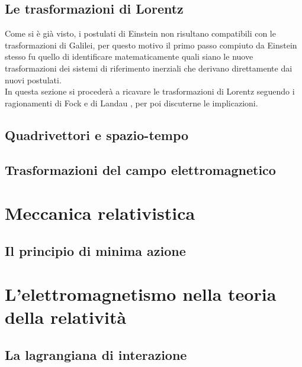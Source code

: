 \documentclass[12pt,a4paper]{book}
\numberwithin{equation}{section}
\begin{document}
\begin{sloppypar}
\section{Le trasformazioni di Lorentz}
Come si è già visto, i postulati di Einstein non risultano compatibili con le trasformazioni di Galilei, 
per questo motivo il primo passo compiuto da Einstein stesso fu quello di identificare matematicamente quali siano 
le nuove trasformazioni dei sistemi di riferimento inerziali che derivano direttamente dai nuovi postulati.\\
In questa sezione si procederà a ricavare le trasformazioni di Lorentz seguendo i ragionamenti di Fock \cite{Fock} e di Landau \cite{Landau}, 
per poi discuterne le implicazioni.  




\section{Quadrivettori e spazio-tempo}
\label{sec:4-vettori}


\section{Trasformazioni del campo elettromagnetico}


\chapter{Meccanica relativistica}
\section{Il principio di minima azione}


%


\chapter{L'elettromagnetismo nella teoria della relatività}
\section{La lagrangiana di interazione}


\end{sloppypar}
\end{document}
